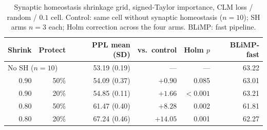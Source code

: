 \begin{table}[h]
\centering
\small
\begin{tabular}{rrrrrr}
\toprule
\textbf{Shrink} & \textbf{Protect} & \textbf{PPL mean (SD)} & \textbf{vs.\ control} & \textbf{Holm $p$} & \textbf{BLiMP-fast} \\
\midrule
\multicolumn{2}{l}{No SH ($n=10$)} & 53.19 (0.19) & — & — & 63.22 \\
0.90 & 50\% & 54.09 (0.37) & $+0.90$ & 0.085 & 63.01 \\
0.90 & 20\% & 54.85 (0.11) & $+1.66$ & $<0.001$ & 63.21 \\
0.80 & 50\% & 61.47 (0.40) & $+8.28$ & 0.002 & 61.81 \\
0.80 & 20\% & 67.24 (0.46) & $+14.05$ & 0.001 & 62.27 \\
\bottomrule
\end{tabular}
\caption{Synaptic homeostasis shrinkage grid, signed-Taylor importance, CLM loss / random / \replayratio $0.1$ cell. Control: same cell without synaptic homeostasis ($n=10$); SH arms $n=3$ each; Holm correction across the four arms. BLiMP: fast pipeline.}
\label{tab:sh-dosage}
\end{table}
